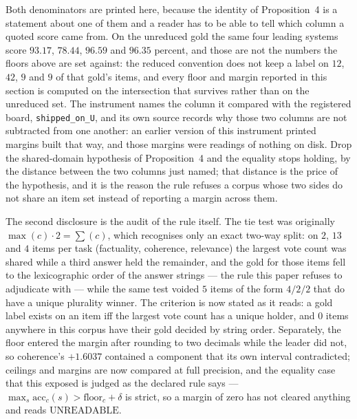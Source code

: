 \documentclass{article}
\begin{document}
Both denominators are printed here, because the identity of Proposition~4 is a statement about one of them and a reader has to be able to tell which column a quoted score came from. On the unreduced gold the same four leading systems score $93.17$, $78.44$, $96.59$ and $96.35$
percent, and those are not the numbers the floors above are set against: the reduced convention does not keep a label on $12$, $42$, $9$ and
$9$ of that gold's items, and every floor and margin reported in this section is computed on the intersection that survives rather than on
the unreduced set. The instrument names the column it compared with the registered board, \texttt{shipped\_on\_U}, and its own source records
why those two columns are not subtracted from one another: an earlier version of this instrument printed margins built that way, and those
margins were readings of nothing on disk. Drop the shared-domain hypothesis of Proposition~4 and the equality stops holding, by the distance
between the two columns just named; that distance is the price of the hypothesis, and it is the reason the rule refuses a corpus whose two
sides do not share an item set instead of reporting a margin across them.

The second disclosure is the audit of the rule itself. The tie test was originally $\max(c)\cdot 2 = \sum(c)$,
which recognises only an exact two-way split: on $2$, $13$ and $4$ items per task (factuality, coherence,
relevance) the largest vote count was shared while a third answer held the remainder, and the gold for those
items fell to the lexicographic order of the answer strings --- the rule this paper refuses to adjudicate with
--- while the same test voided $5$ items of the form $4/2/2$ that do have a unique plurality winner. The
criterion is now stated as it reads: a gold label exists on an item iff the largest vote count has a unique
holder, and $0$ items anywhere in this corpus have their gold decided by string order. Separately, the floor
entered the margin after rounding to two decimals while the leader did not, so coherence's $+1.6037$ contained a
component that its own interval contradicted; ceilings and margins are now compared at full precision, and the
equality case that this exposed is judged as the declared rule says --- $\max_s \mathrm{acc}_c(s) >
\mathrm{floor}_c + \delta$ is strict, so a margin of zero has not cleared anything and reads
$\mathrm{UNREADABLE}$.
\end{document}
